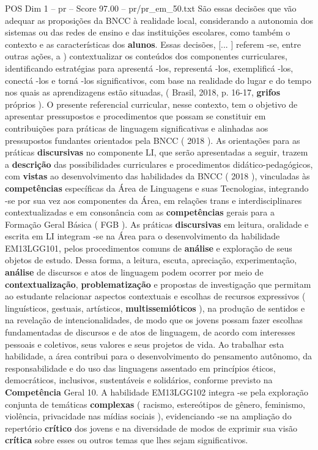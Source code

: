 \begin{textsample}{POS Dim 1 – pr – Score 97.00 – pr/pr\_em\_50.txt}
São essas decisões que vão adequar as proposições da BNCC à realidade local, considerando a autonomia dos sistemas ou das redes de ensino e das instituições escolares, como também o contexto e as características dos \textbf{alunos}.
Essas decisões, [... ] referem -se, entre outras ações, a ) contextualizar os conteúdos dos componentes curriculares, identificando estratégias para apresentá -los, representá -los, exemplificá -los, conectá -los e torná -los significativos, com base na realidade do lugar e do tempo nos quais as aprendizagens estão situadas, ( Brasil, 2018, p. 16-17, \textbf{grifos} próprios ).
O presente referencial curricular, nesse contexto, tem o objetivo de apresentar pressupostos e procedimentos que possam se constituir em contribuições para práticas de linguagem significativas e alinhadas aos pressupostos fundantes orientados pela BNCC ( 2018 ).
As orientações para as práticas \textbf{discursivas} no componente LI, que serão apresentadas a seguir, trazem a \textbf{descrição} das possibilidades curriculares e procedimentos didático-pedagógicos, com \textbf{vistas} ao desenvolvimento das habilidades da BNCC ( 2018 ), vinculadas às \textbf{competências} específicas da Área de Linguagens e suas Tecnologias, integrando -se por sua vez aos componentes da Área, em relações trans e interdisciplinares contextualizadas e em consonância com as \textbf{competências} gerais para a Formação Geral Básica ( FGB ).
As práticas \textbf{discursivas} em leitura, oralidade e escrita em LI integram -se na Área para o desenvolvimento da habilidade EM13LGG101, pelos procedimentos comuns de \textbf{análise} e exploração de seus objetos de estudo.
Dessa forma, a leitura, escuta, apreciação, experimentação, \textbf{análise} de discursos e atos de linguagem podem ocorrer por meio de \textbf{contextualização}, \textbf{problematização} e propostas de investigação que permitam ao estudante relacionar aspectos contextuais e escolhas de recursos expressivos ( linguísticos, gestuais, artísticos, \textbf{multissemióticos} ), na produção de sentidos e na revelação de intencionalidades, de modo que os jovens possam fazer escolhas fundamentadas de discursos e de atos de linguagem, de acordo com interesses pessoais e coletivos, seus valores e seus projetos de vida.
Ao trabalhar esta habilidade, a área contribui para o desenvolvimento do pensamento autônomo, da responsabilidade e do uso das linguagens assentado em princípios éticos, democráticos, inclusivos, sustentáveis e solidários, conforme previsto na \textbf{Competência} Geral 10.
A habilidade EM13LGG102 integra -se pela exploração conjunta de temáticas \textbf{complexas} ( racismo, estereótipos de gênero, feminismo, violência, privacidade nas mídias sociais ), evidenciando -se na ampliação do repertório \textbf{crítico} dos jovens e na diversidade de modos de exprimir sua visão \textbf{crítica} sobre esses ou outros temas que lhes sejam significativos.

\end{textsample}
